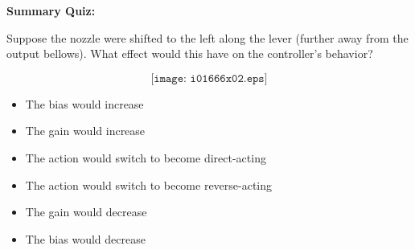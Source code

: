 \vfil \eject

\noindent
{\bf Summary Quiz:}

Suppose the nozzle were shifted to the left along the lever (further away from the output bellows).  What effect would this have on the controller's behavior?

$$\texttt{[image: i01666x02.eps]}$$

\begin{itemize}
\item{} The bias would increase
\vskip 5pt 
\item{} The gain would increase
\vskip 5pt 
\item{} The action would switch to become direct-acting
\vskip 5pt 
\item{} The action would switch to become reverse-acting
\vskip 5pt 
\item{} The gain would decrease
\vskip 5pt 
\item{} The bias would decrease
\end{itemize}




